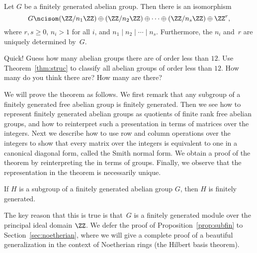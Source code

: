 \begin{theorem}
  \label{thm:struc}
  Let $G$ be a finitely generated abelian group. Then there is an isomorphism
  \[
    G \ncisom (\ZZ/n_1\ZZ) \oplus (\ZZ/n_2\ZZ) \oplus
    \cdots \oplus (\ZZ/n_s\ZZ) \oplus \ZZ^{r},
  \]
  where $r, s\geq 0$, $n_i>1$ for all $i$, and
  $n_1 \mid n_2 \mid \cdots \mid n_s$.
  Furthermore, the $n_i$ and~$r$ are uniquely determined by~$G$.
\end{theorem}

\begin{exercise}
  Quick! Guess how many abelian groups there are of order less than $12$.
  Use Theorem~\ref{thm:struc} to classify all abelian groups of order
  less than $12$. How many do you think there are? How many are there?
\end{exercise}

We will prove the theorem as follows.  We first remark that any
subgroup of a finitely generated free abelian group is finitely
generated.  Then we see how to represent finitely generated abelian groups
as quotients of finite rank free abelian groups, and how to
reinterpret such a presentation in terms of matrices over the
integers.  Next we describe how to use row and column operations over
the integers to show that every matrix over the integers is equivalent
to one in a canonical diagonal form, called the Smith normal form.  We
obtain a proof of the theorem by reinterpreting the  in terms of groups.  Finally, we observe that
the representation in the theorem is necessarily unique.

\begin{proposition}\label{prop:subfin}
  If $H$ is a subgroup of a finitely generated abelian group $G$,
  then $H$ is finitely generated.
\end{proposition}
The key reason that this is true is that~$G$ is a finitely generated
module over the principal ideal domain $\ZZ$.  We defer the
proof of Proposition~\ref{prop:subfin} to Section~\ref{sec:noetherian},
where we will give a complete proof of a beautiful generalization
in the context of Noetherian rings (the Hilbert basis theorem).

